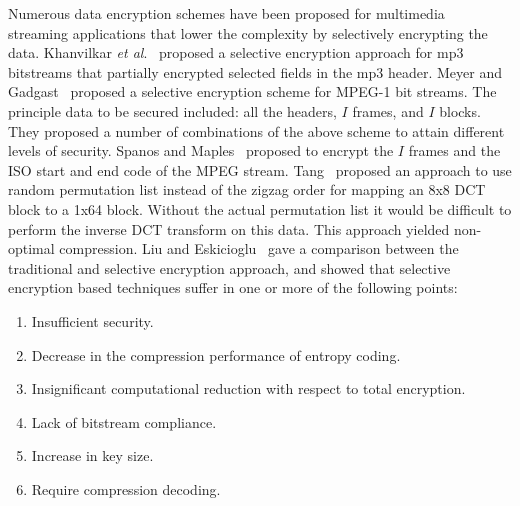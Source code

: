 \documentclass[preprint]{elsarticle}
\begin{document}
Numerous data encryption schemes have been proposed for multimedia \\streaming applications that lower the complexity by selectively encrypting the data. Khanvilkar \textit{et al}.~\cite{Khanvilkar2006} proposed a selective encryption approach for mp3 bitstreams that partially encrypted selected fields in the mp3 header. Meyer and Gadgast~\cite{Meyer1995} proposed a selective encryption scheme for MPEG-1 bit streams. The principle data to be secured included: all the headers, $I$ frames, and $I$ blocks. They proposed a number of combinations of the above scheme to attain different levels of security. Spanos and Maples~\cite{Spanos1995}  proposed to encrypt the $I$ frames and the ISO start and end code of the MPEG stream. Tang~\cite{Tang1996} proposed an approach to use random permutation list instead of the zigzag order for mapping an 8x8 DCT block to a 1x64 block. Without the actual permutation list it would be difficult to perform the inverse DCT transform on this data. This approach yielded non-optimal compression. Liu and Eskicioglu~\cite{Liu2003} gave a comparison between the traditional and selective encryption approach, and showed that selective encryption based techniques suffer in one or more of the following points:

\renewcommand{\labelenumi}{\arabic{enumi}$)$ }
\begin{enumerate}
\item Insufficient security.
\item Decrease in the compression performance of entropy coding.
\item Insignificant computational reduction with respect to total encryption.
\item Lack of bitstream compliance.
\item Increase in key size.
\item Require compression decoding. 
\end{enumerate}
\end{document}
